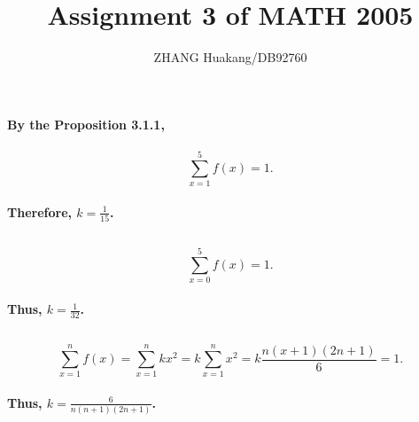\documentclass{article}
\title{Assignment 3 of MATH 2005}
\author{ZHANG Huakang/DB92760}
\begin{document}
    \maketitle

    \section{}
    \subsection{}
        \paragraph{By the Proposition 3.1.1,}
        \paragraph{$$\sum _{x=1} ^5 f(x)=1.$$}
        \paragraph{Therefore, $k=\frac{1}{15}$.}

    \subsection{}
        \paragraph{$$\sum _{x=0} ^5 f(x)=1.$$}
        \paragraph{Thus, $k=\frac{1}{32}$.}

    \subsection{}
        \paragraph{$$\sum _{x=1} ^n f(x)=\sum _{x=1} ^n kx^2=k\sum _{x=1}^n x^2=k\frac{n(x+1)(2n+1)}{6}=1 .$$}
        \paragraph{Thus, $k=\frac{6}{n(n+1)(2n+1)}$.}

    \subsection{}
\end{document}
